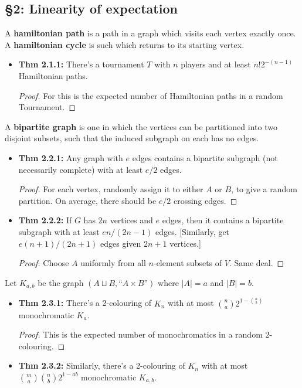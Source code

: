 \documentclass[11pt]{article}
\newenvironment{INT}[1][]{\begin{itemize}\small\item\textbf{#1}}{\end{itemize}}
\newcommand{\moreINT}[1][]{\item\textbf{#1}}
\begin{document}
\begin{chapter2}
\section*{\S2: Linearity of expectation}
\begin{itemise}
\item A \textbf{hamiltonian path} is a path in a graph which visits each vertex exactly once. A \textbf{hamiltonian cycle} is such which returns to its starting vertex.
\begin{INT}[Thm 2.1.1:]
There's a tournament $T$ with $n$ players and at least $n!2^{-(n-1)}$ Hamiltonian paths.
\begin{proof}
For this is the expected number of Hamiltonian paths in a random Tournament.
\end{proof}
\end{INT}
\item A \textbf{bipartite graph} is one in which the vertices can be partitioned into two disjoint subsets, such that the induced subgraph on each has no edges.
\begin{INT}[Thm 2.2.1:]
Any graph with $e$ edges contains a bipartite subgraph (not necessarily complete) with at least $e/2$ edges.
\begin{proof}
For each vertex, randomly assign it to either $A$ or $B$, to give a random partition. On average, there should be $e/2$ crossing edges.
\end{proof}
\moreINT[Thm 2.2.2:]
If $G$ has $2n$ vertices and $e$ edges, then it contains a bipartite subgraph with at least $en/(2n-1)$ edges. [Similarly, get $e(n+1)/(2n+1)$ edges given $2n+1$ vertices.]
\begin{proof}
Choose $A$ uniformly from all $n$-element subsets of $V$. Same deal.
\end{proof}
\end{INT}
\item {}
\item Let $K_{a,b}$ be the graph $(A\sqcup B,\text{``$A\times B$''})$ where $|A|=a$ and $|B|=b$.
\begin{INT}[Thm 2.3.1:]
There's a 2-colouring of $K_n$ with at most ${n\choose a}2^{1-{a\choose 2}}$ monochromatic $K_a$.
\begin{proof}
This is the expected number of monochromatics in a random 2-colouring.
\end{proof}
\moreINT[Thm 2.3.2:] Similarly, there's a 2-colouring of $K_n$ with at most ${m\choose a}{n\choose b}2^{1-ab}$ monochromatic $K_{a,b}$.

\end{INT}
\end{itemise}
\end{chapter2}
\end{document}
